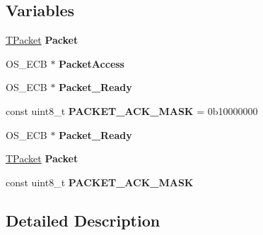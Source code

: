 \subsection*{Variables}
\begin{DoxyCompactItemize}
\item 
\hypertarget{group__packet__module_gac74c1cf77ae5807a61baefd6df20201e}{}\hyperlink{union_t_packet}{T\+Packet} {\bfseries Packet}\label{group__packet__module_gac74c1cf77ae5807a61baefd6df20201e}

\item 
\hypertarget{group__packet__module_ga9cda254b674885270fe8312184892e76}{}O\+S\+\_\+\+E\+C\+B $\ast$ {\bfseries Packet\+Access}\label{group__packet__module_ga9cda254b674885270fe8312184892e76}

\item 
\hypertarget{group__packet__module_gaf473e320ff2c4865eb932b3803e4e753}{}O\+S\+\_\+\+E\+C\+B $\ast$ {\bfseries Packet\+\_\+\+Ready}\label{group__packet__module_gaf473e320ff2c4865eb932b3803e4e753}

\item 
\hypertarget{group__packet__module_ga5faca24c448374dc4656ebc31afcae0b}{}const uint8\+\_\+t {\bfseries P\+A\+C\+K\+E\+T\+\_\+\+A\+C\+K\+\_\+\+M\+A\+S\+K} = 0b10000000\label{group__packet__module_ga5faca24c448374dc4656ebc31afcae0b}

\item 
\hypertarget{group__packet__module_gaf473e320ff2c4865eb932b3803e4e753}{}O\+S\+\_\+\+E\+C\+B $\ast$ {\bfseries Packet\+\_\+\+Ready}\label{group__packet__module_gaf473e320ff2c4865eb932b3803e4e753}

\item 
\hypertarget{group__packet__module_gac74c1cf77ae5807a61baefd6df20201e}{}\hyperlink{union_t_packet}{T\+Packet} {\bfseries Packet}\label{group__packet__module_gac74c1cf77ae5807a61baefd6df20201e}

\item 
\hypertarget{group__packet__module_ga5faca24c448374dc4656ebc31afcae0b}{}const uint8\+\_\+t {\bfseries P\+A\+C\+K\+E\+T\+\_\+\+A\+C\+K\+\_\+\+M\+A\+S\+K}\label{group__packet__module_ga5faca24c448374dc4656ebc31afcae0b}

\end{DoxyCompactItemize}


\subsection{Detailed Description}


